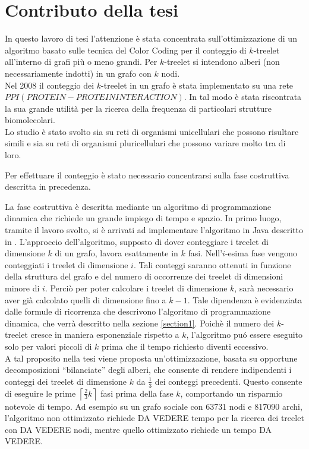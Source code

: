 \section{Contributo della tesi}

In questo lavoro di tesi l'attenzione \`e stata concentrata  sull'ottimizzazione di un algoritmo basato sulle tecnica del Color Coding per il conteggio di $k$-treelet all'interno di grafi pi\`u o meno grandi.
Per $ k $-treelet  si intendono alberi (non necessariamente indotti) in un grafo con $ k $ nodi.\\
Nel 2008 il conteggio dei $ k $-treelet in un grafo è stata implementato su una rete $ PPI(PROTEIN-PROTEIN INTERACTION) $. In tal modo è stata riscontrata la sua grande utilità per la ricerca della frequenza di particolari strutture biomolecolari.\\
Lo studio è stato svolto sia su reti di organismi unicellulari che possono risultare simili e sia su reti di organismi pluricellulari che possono variare molto tra di loro.

Per effettuare il conteggio \`e stato necessario concentrarsi sulla fase costruttiva descritta in precedenza.

La fase costruttiva \`e descritta mediante un algoritmo di programmazione dinamica che richiede un grande impiego di tempo e spazio.
In primo luogo, tramite il lavoro svolto, si è arrivati ad implementare l'algoritmo in Java descritto in  \cite{bressan2018motif}.
L'approccio dell'algoritmo, supposto di dover conteggiare i treelet di dimensione $ k $ di un grafo, lavora esattamente  in $ k $ fasi.
Nell'$ i $-esima fase vengono conteggiati i treelet di dimensione $ i $.
Tali conteggi saranno ottenuti in funzione della struttura del grafo e del numero di occorrenze dei treelet di dimensioni minore di $ i $.
Perci\`o per poter calcolare i treelet di dimensione $ k $, sar\`a necessario aver gi\`a calcolato quelli di dimensione fino a $ k-1 $.
Tale dipendenza \`e evidenziata dalle formule di ricorrenza che descrivono l'algoritmo di programmazione dinamica, che verr\`a descritto nella sezione \ref{section1}.
Poich\`e il numero dei $ k $-treelet cresce in maniera esponenziale rispetto a $ k $, l'algoritmo pu\'o essere eseguito solo per valori piccoli di $ k $ prima che il tempo richiesto diventi eccessivo.\\
A tal proposito nella tesi viene proposta un'ottimizzazione, basata su opportune decomposizioni ``bilanciate'' degli alberi, che consente di rendere indipendenti i conteggi dei treelet di dimensione $ k $ da $\frac{1}{3}$ dei conteggi precedenti.
Questo consente di eseguire le prime $\left\lceil \frac{2}{3} k\right\rceil$  fasi prima della fase $ k $, comportando un risparmio notevole di tempo.
Ad esempio su un grafo sociale con 63731 nodi e 817090 archi, l'algoritmo non ottimizzato richiede DA VEDERE tempo per la ricerca dei treelet con DA VEDERE nodi, mentre quello ottimizzato richiede un tempo DA VEDERE.



